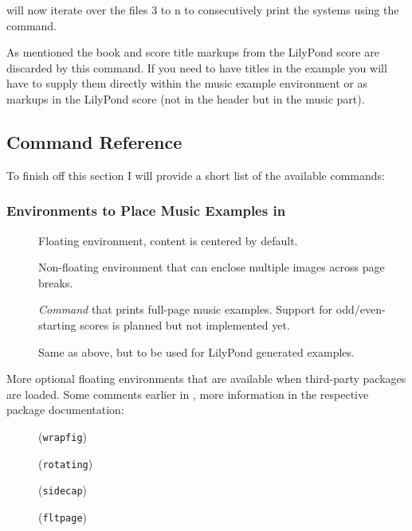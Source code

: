 \documentclass[../openLilyLib]{subfiles}
\begin{document}
 will now iterate over the files 3 to n to consecutively print the systems using the  command.
\\

As mentioned the book and score title markups from the LilyPond score are discarded by this command.
If you need to have titles in the example you will have to supply them directly within the music example environment or as markups in the LilyPond score (not in the header but in the music part).

\subsection{Command Reference}
\label{subsec:xmp_command-reference}
To finish off this section I will provide a short list of the available commands:

\subsubsection*{Environments to Place Music Examples in}
\begin{description}
\item[] Floating environment, content is centered by default.
\item[] Non-floating environment that can enclose multiple images across page breaks.
\item[] \emph{Command} that prints full-page music examples.
Support for odd/even-starting scores is planned but not implemented yet.
\item[] Same as above, but to be used for LilyPond generated examples.
\end{description}

More optional floating environments that are available when third-party packages are loaded.
Some comments earlier in , more information in the respective package documentation:
\begin{description}
\item[](\texttt{wrapfig})
\item[] (\texttt{rotating})
\item[] (\texttt{sidecap})
\item[{}] (\texttt{fltpage})
\end{description}
\end{document}
